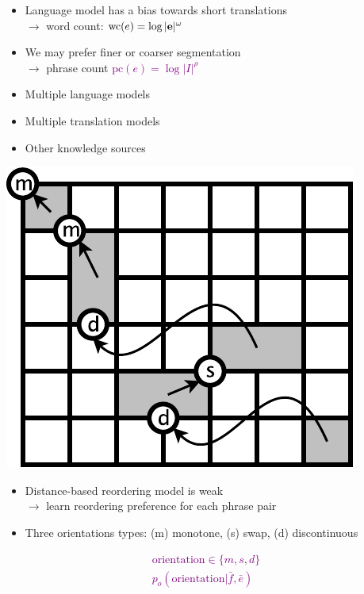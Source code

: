 \documentclass[landscape]{slides}
\newcommand{\maths}[1]{\textcolor{purple}{#1}}
\begin{document}
\begin{itemize}
\item Language model has a bias towards short translations\\[5mm]
$\rightarrow$ word count:  \maths{$\mbox{wc}(e) = \log |{\bf e}|^\omega$}

\item We may prefer finer or coarser segmentation\\[5mm]
$\rightarrow$ phrase count  \maths{$\mbox{pc}(e) = \log |I|^\rho$}

\item Multiple language models
\item Multiple translation models
\item Other knowledge sources
\end{itemize}


\begin{center}
\includegraphics[scale=1]{lexicalized-reordering.pdf}
\end{center} \vspace{-4mm}
\begin{itemize}
\item Distance-based reordering model is weak\\[2mm]
$\rightarrow$ learn reordering preference for each phrase pair\vspace{-3mm}
\item Three orientations types: (m) monotone, (s) swap, (d) discontinuous \vspace{-6mm}
\end{itemize}
\maths{\begin{equation*}
\begin{split}
\mbox{orientation} \in \{m, s, d\}\\
p_o(\mbox{orientation}|\bar{f},\bar{e})
\end{split}
\end{equation*}}
\end{document}
